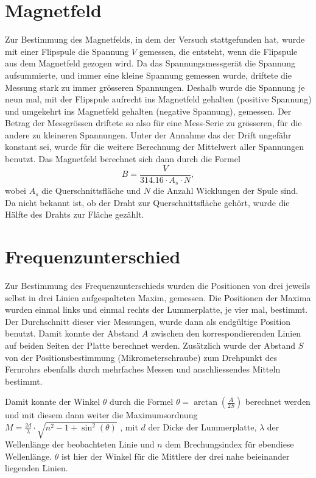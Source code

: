 \documentclass[a4paper,parskip,11pt, DIV12]{scrreprt}
\begin{document}
	\section{Magnetfeld}
	
	Zur Bestimmung des Magnetfelds, in dem der Versuch stattgefunden hat, wurde mit einer Flipspule die Spannung $V$ gemessen, die entsteht, wenn die Flipspule aus dem Magnetfeld gezogen wird. Da das Spannungsmessgerät die Spannung aufsummierte, und immer eine kleine Spannung gemessen wurde, driftete die Messung stark zu immer grösseren Spannungen. Deshalb wurde die Spannung je neun mal, mit der Flipspule aufrecht ins Magnetfeld gehalten (positive Spannung) und umgekehrt ins Magnetfeld gehalten (negative Spannung), gemessen. Der Betrag der Messgrössen driftete so also für eine Mess-Serie zu grösseren, für die andere zu kleineren Spannungen. Unter der Annahme das der Drift ungefähr konstant sei, wurde für die weitere Berechnung der Mittelwert aller Spannungen benutzt.   
	Das Magnetfeld berechnet sich dann durch die Formel
	\begin{equation}
	\label{B-Feld}
	B = \frac{V}{314.16 \cdot A_s \cdot N} ,
	\end{equation}
	wobei $A_s$ die Querschnittsfläche und $N$ die Anzahl Wicklungen der Spule sind. Da nicht bekannt ist, ob der Draht zur Querschnittsfläche gehört, wurde die Hälfte des Drahts zur Fläche gezählt. 
	
	\section{Frequenzunterschied}
	
	Zur Bestimmung des Frequenzunterschieds wurden die Positionen von drei jeweils selbst in drei Linien aufgespalteten Maxim, gemessen. Die Positionen der Maxima wurden einmal links und einmal rechts der Lummerplatte, je vier mal, bestimmt. Der Durchschnitt dieser vier Messungen, wurde dann als endgültige Position benutzt. Damit konnte der Abstand $A$ zwischen den korrespondierenden Linien auf beiden Seiten der Platte berechnet werden. Zusätzlich wurde der Abstand $S$ von der Positionsbestimmung (Mikrometerschraube) zum Drehpunkt des Fernrohrs ebenfalls durch mehrfaches Messen und anschliessendes Mitteln bestimmt. 

Damit konnte der Winkel $\theta$ durch die Formel $\theta = \arctan(\frac{A}{2 S})$ berechnet werden und mit diesem dann weiter die Maximumsordnung  $M = \frac{2d}{\lambda} \cdot \sqrt{n^2-1+\sin^2(\theta)}$ , mit $d$ der Dicke der Lummerplatte, $\lambda$ der Wellenlänge der beobachteten Linie und $n$ dem Brechungsindex für ebendiese Wellenlänge. $\theta$ ist hier der Winkel für die Mittlere der drei nahe beieinander liegenden Linien. 
\end{document}
